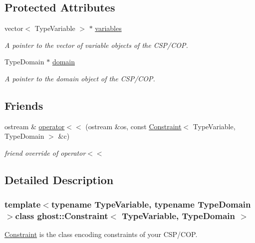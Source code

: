 \subsection*{Protected Attributes}
\begin{DoxyCompactItemize}
\item 
vector$<$ Type\-Variable $>$ $\ast$ \hyperlink{classghost_1_1Constraint_a827e487bd77c8dbc4701d1dfae39678a}{variables}
\begin{DoxyCompactList}\small\item\em A pointer to the vector of variable objects of the C\-S\-P/\-C\-O\-P. \end{DoxyCompactList}\item 
Type\-Domain $\ast$ \hyperlink{classghost_1_1Constraint_a0ea15d113ab23ddb6ad74be72f7ac90d}{domain}
\begin{DoxyCompactList}\small\item\em A pointer to the domain object of the C\-S\-P/\-C\-O\-P. \end{DoxyCompactList}\end{DoxyCompactItemize}
\subsection*{Friends}
\begin{DoxyCompactItemize}
\item 
ostream \& \hyperlink{classghost_1_1Constraint_a5fb3db9a0881ff7aae65d680386277f0}{operator$<$$<$} (ostream \&os, const \hyperlink{classghost_1_1Constraint}{Constraint}$<$ Type\-Variable, Type\-Domain $>$ \&c)
\begin{DoxyCompactList}\small\item\em friend override of operator$<$$<$ \end{DoxyCompactList}\end{DoxyCompactItemize}


\subsection{Detailed Description}
\subsubsection*{template$<$typename Type\-Variable, typename Type\-Domain$>$class ghost\-::\-Constraint$<$ Type\-Variable, Type\-Domain $>$}

\hyperlink{classghost_1_1Constraint}{Constraint} is the class encoding constraints of your C\-S\-P/\-C\-O\-P. 

